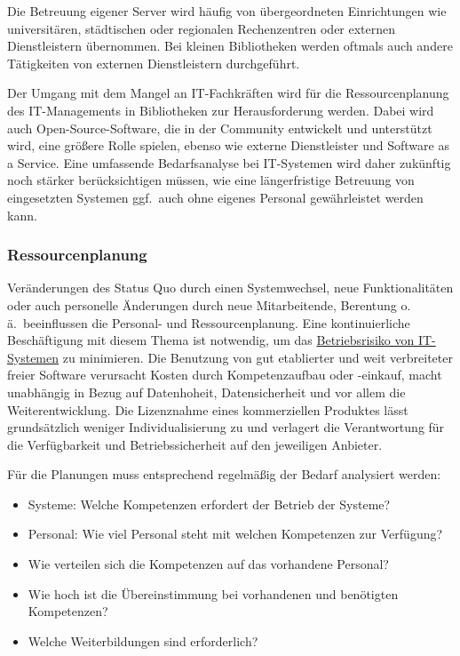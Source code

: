 \documentclass[
  11pt,
  letterpaper,
  DIV=11,
  twoside]{scrreprt}
\begin{document}
Die Betreuung eigener Server wird häufig von übergeordneten
Einrichtungen wie universitären, städtischen oder regionalen
Rechenzentren oder externen Dienstleistern übernommen. Bei kleinen
Bibliotheken werden oftmals auch andere Tätigkeiten von externen
Dienstleistern durchgeführt.

Der Umgang mit dem Mangel an IT-Fachkräften wird für die
Ressourcenplanung des IT-Managements in Bibliotheken zur Herausforderung
werden. Dabei wird auch Open-Source-Software, die in der Community
entwickelt und unterstützt wird, eine größere Rolle spielen, ebenso wie
externe Dienstleister und Software as a Service. Eine umfassende
Bedarfsanalyse bei IT-Systemen wird daher zukünftig noch stärker
berücksichtigen müssen, wie eine längerfristige Betreuung von
eingesetzten Systemen ggf.~auch ohne eigenes Personal gewährleistet
werden kann.

\subsubsection{Ressourcenplanung}\label{ressourcenplanung}

Veränderungen des Status Quo durch einen Systemwechsel, neue
Funktionalitäten oder auch personelle Änderungen durch neue
Mitarbeitende, Berentung o.\,ä.~beeinflussen die Personal- und
Ressourcenplanung. Eine kontinuierliche Beschäftigung mit diesem Thema
ist notwendig, um das
\hyperref[betriebssicherheit-und-risikomanagement]{Betriebsrisiko von
IT-Systemen} zu minimieren. Die Benutzung von gut etablierter und weit
verbreiteter freier Software verursacht Kosten durch Kompetenzaufbau
oder -einkauf, macht unabhängig in Bezug auf Datenhoheit,
Datensicherheit und vor allem die Weiterentwicklung. Die Lizenznahme
eines kommerziellen Produktes lässt grundsätzlich weniger
Individualisierung zu und verlagert die Verantwortung für die
Verfügbarkeit und Betriebssicherheit auf den jeweiligen Anbieter.

Für die Planungen muss entsprechend regelmäßig der Bedarf analysiert
werden:

\begin{itemize}
\item
  Systeme: Welche Kompetenzen erfordert der Betrieb der Systeme?
\item
  Personal: Wie viel Personal steht mit welchen Kompetenzen zur
  Verfügung?
\item
  Wie verteilen sich die Kompetenzen auf das vorhandene Personal?
\item
  Wie hoch ist die Übereinstimmung bei vorhandenen und benötigten
  Kompetenzen?
\item
  Welche Weiterbildungen sind erforderlich?
\end{itemize}
\end{document}
